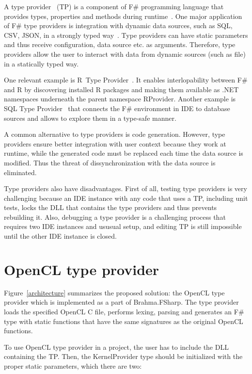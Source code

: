 \documentclass[sigplan,review]{acmart}\settopmatter{printfolios=true}
\begin{document}
A type provider~\cite{syme2012strongly} (TP) is a component of F\# programming language that provides types, properties and methods during runtime~\cite{TypeProviders}. One major application of F\# type providers is integration with dynamic data sources, such as SQL, CSV, JSON, in a strongly typed way~\cite{FSharpData}. Type providers can have static parameters and thus receive configuration, data source etc. as arguments. Therefore, type providers allow the user to interact with data from dynamic sources (such as file) in a statically typed way.

One relevant example is R~Type Provider~\cite{R_TP}. It enables interlopability between F\# and R by discovering installed R packages and making them available as .NET namespaces underneath the parent namespace RProvider. Another example is SQL Type Provider~\cite{SQL_TP} that connects the F\# environment in IDE to database sources and allows to explore them in a type-safe manner.

A common alternative to type providers is code generation. However, type providers ensure better integration with user context because they work at runtime, while the generated code must be replaced each time the data source is modified. Thus the threat of dissynchronization with the data source is eliminated.

Type providers also have disadvantages. First of all, testing type providers is very challenging because an IDE instance with any code that uses a TP, including unit tests, locks the DLL that contains the type providers and thus prevents rebuilding it. Also, debugging a type provider is a challenging process that requires two IDE instances and ususual setup, and editing TP is still impossible until the other IDE instance is closed.

\section{OpenCL type provider}

Figure~\ref{architecture} summarizes the proposed solution: the OpenCL type provider which is implemented as a part of Brahma.FSharp. The type provider loads the specified OpenCL C file, performs lexing, parsing and generates an F\# type with static functions that have the same signatures as the original OpenCL functions.

To use OpenCL type provider in a project, the user has to include the DLL containing the TP. Then, the KernelProvider type should be initialized with the proper static parameters, which there are two:
\end{document}
